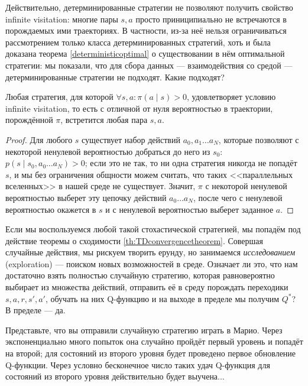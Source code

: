 Действительно, детерминированные стратегии не позволяют получить свойство infinite visitation: многие пары $s, a$ просто приниципиально не встречаются в порождаемых ими траекториях. В частности, из-за неё нельзя ограничиваться рассмотрением только класса детерминированных стратегий, хоть и была доказана теорема \ref{deterministicoptimal} о существовании в нём оптимальной стратегии: мы показали, что для сбора данных --- взаимодействия со средой --- детерминированные стратегии не подходят. Какие подходят?

\begin{theorem}
Любая стратегия, для которой $\forall s, a \colon \pi(a \mid s) > 0$, удовлетворяет условию infinite visitation, то есть с отличной от нуля вероятностью в траектории, порождённой $\pi$, встретится любая пара $s, a$.
\begin{proof}
Для любого $s$ существует набор действий $a_0, a_1 \dots a_N$, которые позволяют с некоторой ненулевой вероятностью добраться до него из $s_0$: $p(s \mid s_0, a_0 \dots a_N) > 0$; если это не так, то ни одна стратегия никогда не попадёт $s$, и мы без ограничения общности можем считать, что таких <<параллельных вселенных>> в нашей среде не существует. Значит, $\pi$ с некоторой ненулевой вероятностью выберет эту цепочку действий $a_0 \dots a_N$, после чего с ненулевой вероятностью окажется в $s$ и с ненулевой вероятностью выберет заданное $a$.
\end{proof}
\end{theorem}

Если мы воспользуемся любой такой стохастической стратегией, мы попадём под действие теоремы о сходимости \ref{th:TDconvergencetheorem}. Совершая случайные действия, мы рискуем творить ерунду, но занимаемся \emph{исследованием} (exploration) --- поиском новых возможностей в среде. Означает ли это, что нам достаточно взять полностью случайную стратегию, которая равновероятно выбирает из множества действий, отправить её в среду порождать переходики $s, a, r, s', a'$, обучать на них Q-функцию и на выходе в пределе мы получим $Q^*$? В пределе --- да.

\begin{example}
Представьте, что вы отправили случайную стратегию играть в Марио. Через экспоненциально много попыток она случайно пройдёт первый уровень и попадёт на второй; для состояний из второго уровня будет проведено первое обновление Q-функции. Через условно бесконечное число таких удач Q-функция для состояний из второго уровня действительно будет выучена...
\end{example}

